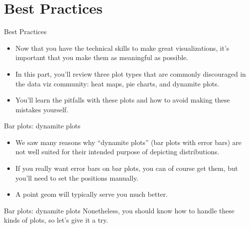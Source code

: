 \documentclass[
  ignorenonframetext,
]{beamer}
\begin{document}
\section{Best Practices}\label{best-practices}

\begin{frame}{Best Practices}
\label{best-practices-1}
\begin{itemize}
\item
  Now that you have the technical skills to make great visualizations,
  it's important that you make them as meaningful as possible.
\item
  In this part, you'll review three plot types that are commonly
  discouraged in the data viz community: heat maps, pie charts, and
  dynamite plots.
\item
  You'll learn the pitfalls with these plots and how to avoid making
  these mistakes yourself.
\end{itemize}
\end{frame}

\begin{frame}{Bar plots: dynamite plots}
\label{bar-plots-dynamite-plots}
\begin{itemize}
\item
  We saw many reasons why ``dynamite plots'' (bar plots with error bars)
  are not well suited for their intended purpose of depicting
  distributions.
\item
  If you really want error bars on bar plots, you can of course get
  them, but you'll need to set the positions manually.
\item
  A point geom will typically serve you much better.
\end{itemize}
\end{frame}

\begin{frame}{Bar plots: dynamite plots}
\label{bar-plots-dynamite-plots-1}
Nonetheless, you should know how to handle these kinds of plots, so
let's give it a try.
\end{frame}
\end{document}
